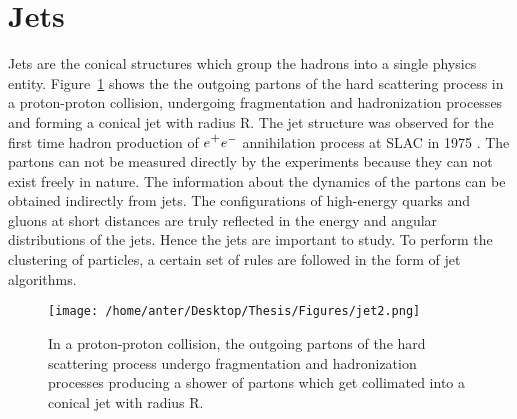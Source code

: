 \section{Jets}
\label{sec:jets}
Jets \cite{Sterman:1977wj} are the conical structures which group the hadrons into a single physics entity. Figure~\ref{fig:jet_r} shows the the outgoing partons of the hard scattering process in a proton-proton collision, undergoing fragmentation and hadronization processes and forming a conical jet with radius R. The jet structure was observed for the first time hadron production of $e^\plusn e^-$ annihilation process at SLAC in 1975 \cite{Hanson:1975fe}. The partons can not be measured directly by the experiments because they can not exist freely in nature. The information about the dynamics of the partons can be obtained indirectly from jets. The configurations of high-energy quarks and gluons at short distances are truly reflected in the energy and angular distributions of the jets. Hence the jets are important to study. To perform the clustering of particles, a certain set of rules are followed in the form of jet algorithms. 

\begin{figure}[!h]
\begin{center}
\hspace*{-7mm}
\texttt{[image: /home/anter/Desktop/Thesis/Figures/jet2.png]}\\
\vspace*{4mm}
\caption[Formation of a jet in a proton-proton collision.]{In a proton-proton collision, the outgoing partons of the hard scattering process undergo fragmentation and hadronization processes producing a shower of partons which get collimated into a conical jet with radius R.}
\label{fig:jet_r}
\end{center}
\end{figure}

